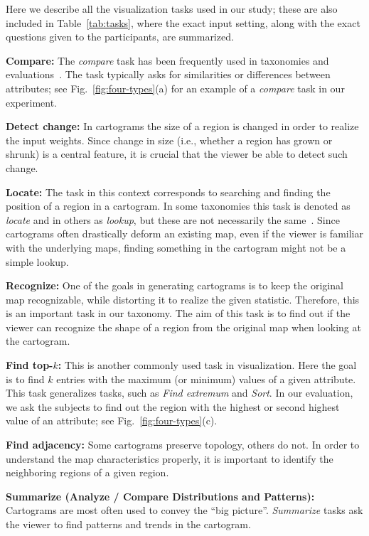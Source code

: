 \documentclass[10pt,journal,compsoc]{IEEEtran}
\begin{document}
Here we describe all the visualization tasks used in our study; these are also included in Table~\ref{tab:tasks}, where  the exact input setting, along with the exact questions given to the participants, are summarized.





\textbf{Compare:}
The \textit{compare} task has been frequently used in taxonomies and evaluations~\cite{Jen, RR13, Weh93}. The task typically asks for similarities or differences between attributes; see 
Fig.~\ref{fig:four-types}(a) for an example of a \textit{compare} task in our experiment.

\textbf{Detect change:} 
In cartograms the size of a region is changed in order to realize the input weights. Since change in size (i.e., whether a region has grown or shrunk) is a central feature, it is crucial that the viewer be able to detect such change.


\textbf{Locate:}
The task in this context corresponds to searching and finding the position of a region in a cartogram. In some taxonomies this task is denoted as \textit{locate} and in others as  \textit{lookup}, but these are not necessarily the same~\cite{BM13}.
Since cartograms often drastically deform an existing map, even if the viewer is familiar with the underlying maps, finding something in the cartogram might not be a simple lookup. 

\textbf{Recognize:}
One of the goals in generating cartograms is to keep the original map recognizable, while distorting it to realize the given statistic. Therefore, this is an important task in our taxonomy. The aim of this task is to find out if the viewer can recognize the shape of a region from the original map when looking at the cartogram. 

\textbf{Find top-$k$:}
This is another commonly used task in visualization. Here the goal is to find $k$ entries with the maximum
 (or minimum) values of a given attribute. This task generalizes tasks,
 such as \textit{Find extremum} and 
 \textit{Sort}. In our evaluation, we ask the subjects to find out the region with the highest or second highest value of an attribute; see Fig.~\ref{fig:four-types}(c).



\textbf{Find adjacency:}
Some cartograms preserve topology, others do not. In order to understand the map characteristics properly, it is important to identify the neighboring regions of a given region.

\textbf{Summarize (Analyze / Compare Distributions and Patterns):}
Cartograms are most often used to convey the ``big picture''. \textit{Summarize} tasks ask the viewer to find patterns and trends in the cartogram.
\end{document}
